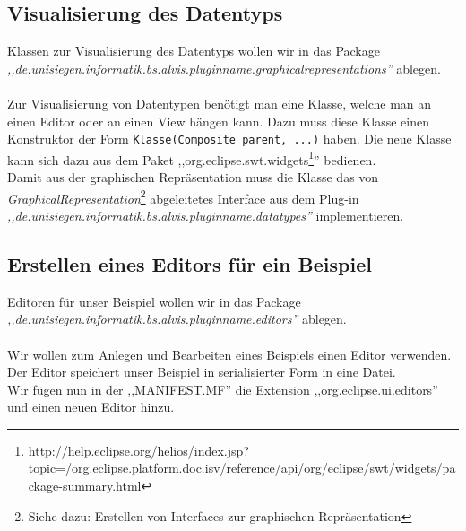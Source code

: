 \documentclass[10pt,a4paper]{article}
\begin{document}
\subsection{Visualisierung des Datentyps}
Klassen zur Visualisierung des Datentyps wollen wir in das Package \\ \textit{,,de.unisiegen.informatik.bs.alvis.pluginname.graphicalrepresentations''} ablegen.\\ 
\\
Zur Visualisierung von Datentypen benötigt man eine Klasse, welche man an einen Editor oder an einen View hängen kann. Dazu muss diese Klasse einen Konstruktor der Form 
\lstinline{Klasse(Composite parent, ...)} 
haben. Die neue Klasse kann sich dazu aus dem Paket 
,,org.eclipse.swt.widgets\footnote{
\href{http://help.eclipse.org/helios/index.jsp?topic=/org.eclipse.platform.doc.isv/reference/api/org/eclipse/swt/widgets/package-summary.html}{http://help.eclipse.org/helios/index.jsp?topic=/org.eclipse.platform.doc.isv/reference/api/org/eclipse/swt/widgets/package-summary.html}}''
bedienen. \\ 
Damit aus der graphischen Repräsentation  muss die Klasse das von 
\textit{GraphicalRepresentation}\footnote{Siehe dazu: Erstellen von Interfaces zur graphischen Repräsentation} abgeleitetes Interface aus dem Plug-in \\ \textit{,,de.unisiegen.informatik.bs.alvis.pluginname.datatypes''} implementieren.

\subsection{Erstellen eines Editors für ein Beispiel}
Editoren für unser Beispiel wollen wir in das Package \\ \textit{,,de.unisiegen.informatik.bs.alvis.pluginname.editors''} ablegen.\\ 
\\
Wir wollen zum Anlegen und Bearbeiten eines Beispiels einen Editor verwenden. Der Editor speichert unser Beispiel in serialisierter Form in eine Datei. \\
Wir fügen nun in der ,,MANIFEST.MF'' die Extension ,,org.eclipse.ui.editors''  und einen neuen Editor hinzu. \\
\end{document}
